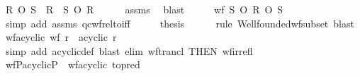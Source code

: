 \begin{isabellebody}
\ {\isachardoublequoteopen}R\ O\ S\ {\isasymsubseteq}\ {\isacharparenleft}{\kern0pt}R\ {\isasymunion}\ S{\isacharparenright}{\kern0pt}\isactrlsup {\isacharasterisk}{\kern0pt}\ O\ R{\isachardoublequoteclose}\isanewline
\ \ \ \ \isamarkupfalse%
\ assms\ \isamarkupfalse%
\ blast\isanewline
\ \ \isamarkupfalse%
\ \isamarkupfalse%
\ {\isachardoublequoteopen}wf\ {\isacharparenleft}{\kern0pt}S\isactrlsup {\isacharasterisk}{\kern0pt}\ O\ R\ O\ S\isactrlsup {\isacharasterisk}{\kern0pt}{\isacharparenright}{\kern0pt}{\isachardoublequoteclose}\isanewline
\ \ \ \ \isamarkupfalse%
\ {\isacharparenleft}{\kern0pt}simp\ add{\isacharcolon}{\kern0pt}\ assms\ qc{\isacharunderscore}{\kern0pt}wf{\isacharunderscore}{\kern0pt}relto{\isacharunderscore}{\kern0pt}iff{\isacharparenright}{\kern0pt}\isanewline
\ \ \isamarkupfalse%
\ \isamarkupfalse%
\ {\isacharquery}{\kern0pt}thesis\isanewline
\ \ \ \ \isamarkupfalse%
\ {\isacharparenleft}{\kern0pt}rule\ Wellfounded{\isachardot}{\kern0pt}wf{\isacharunderscore}{\kern0pt}subset{\isacharparenright}{\kern0pt}\ blast\isanewline
{}\isamarkupfalse%
%
\endisatagproof
{\isafoldproof}%
%
\isadelimproof
%
\endisadelimproof
%
\isadelimdocument
%
\endisadelimdocument
%
\isatagdocument
%
\isamarkuptrue%
%
\endisatagdocument
{\isafolddocument}%
%
\isadelimdocument
%
\endisadelimdocument
{}\isamarkupfalse%
\ wf{\isacharunderscore}{\kern0pt}acyclic{\isacharcolon}{\kern0pt}\ {\isachardoublequoteopen}wf\ r\ {\isasymLongrightarrow}\ acyclic\ r{\isachardoublequoteclose}\isanewline
%
\isadelimproof
\ \ %
\endisadelimproof
%
\isatagproof
{}\isamarkupfalse%
\ {\isacharparenleft}{\kern0pt}simp\ add{\isacharcolon}{\kern0pt}\ acyclic{\isacharunderscore}{\kern0pt}def{\isacharparenright}{\kern0pt}\ {\isacharparenleft}{\kern0pt}blast\ elim{\isacharcolon}{\kern0pt}\ wf{\isacharunderscore}{\kern0pt}trancl\ {\isacharbrackleft}{\kern0pt}THEN\ wf{\isacharunderscore}{\kern0pt}irrefl{\isacharbrackright}{\kern0pt}{\isacharparenright}{\kern0pt}%
\endisatagproof
{\isafoldproof}%
%
\isadelimproof
\isanewline
%
\endisadelimproof
\isanewline
{}\isamarkupfalse%
\ wfP{\isacharunderscore}{\kern0pt}acyclicP\ {\isacharequal}{\kern0pt}\ wf{\isacharunderscore}{\kern0pt}acyclic\ {\isacharbrackleft}{\kern0pt}to{\isacharunderscore}{\kern0pt}pred{\isacharbrackright}{\kern0pt}%
\isadelimdocument
%
\endisadelimdocument
%
\isatagdocument
%
\end{isabellebody}

